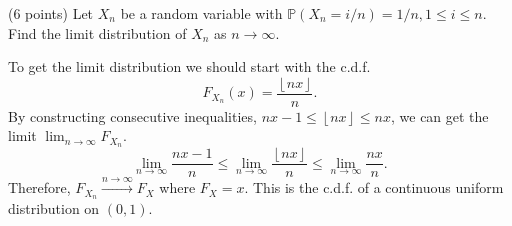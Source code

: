 \documentclass[answers]{exam}
\begin{document}
\begin{questions}
\begin{solution}
   \end{solution}
   \begin{solution}

   \end{solution}
   \question
   (6 points) Let $X_{n}$ be a random variable with $\mathbb{P}\left(X_{n}=i/n\right) = 1/n, 1\leq i \leq n$. Find the limit distribution of $X_{n}$ as $n \to \infty$.
   \begin{solution}
      To get the limit distribution we should start with the c.d.f.
      $$
      F_{X_{n}}\left(x\right) = \frac{\left\lfloor nx \right\rfloor}{n}.
      $$
      By constructing consecutive inequalities, $nx -1 \leq \left\lfloor nx \right\rfloor \leq nx$, we can get the limit $\lim_{n\to\infty} F_{X_{n}}$.
      $$
      \lim_{n\to\infty}\frac{nx-1}{n}\leq \lim_{n\to\infty}\frac{\left\lfloor nx \right \rfloor}{n}\leq \lim_{n\to\infty}\frac{nx}{n}.
      $$
      Therefore, $F_{X_{n}} \xrightarrow{n\to\infty} F_{X}$ where $F_{X} = x$. This is the c.d.f. of a continuous uniform distribution on $(0,1)$.
   \end{solution}
\end{questions}
\end{document}
